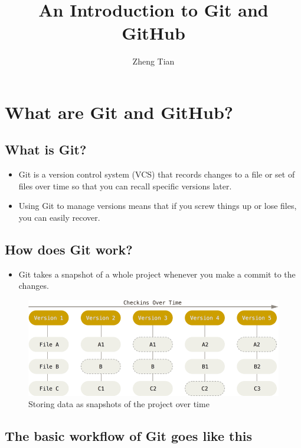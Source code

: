 \documentclass[a4paper,11pt]{article}
\author{Zheng Tian}
\date{}
\title{An Introduction to Git and GitHub}
\begin{document}
\maketitle


\section{What are Git and GitHub?}
\label{sec:orga6a35b3}

\subsection{What is Git?}
\label{sec:org9b6e266}

\begin{itemize}
\item Git is a version control system (VCS) that records changes to a file
or set of files over time so that you can recall specific versions
later.

\item Using Git to manage versions means that if you screw things up or
lose files, you can easily recover.
\end{itemize}

\subsection{How does Git work?}
\label{sec:org94651da}

\begin{itemize}
\item Git takes a snapshot of a whole project whenever you make a commit
to the changes.
\end{itemize}
\begin{figure}[htbp]
\centering
\includegraphics[width=.9\linewidth]{img/snapshots.png}
\caption{\label{fig:org8e73f72}
Storing data as snapshots of the project over time}
\end{figure}

\subsection{The basic workflow of Git goes like this}
\label{sec:org59be77f}
\end{document}
